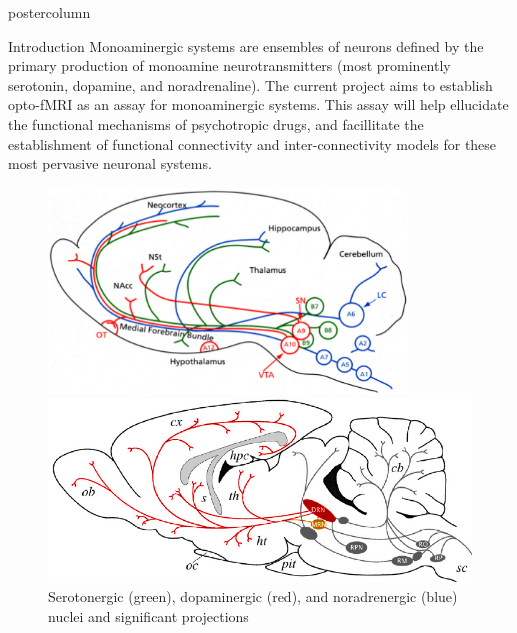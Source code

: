 \documentclass{beamer}
\begin{document}
\begin{frame}
\begin{columns}
\begin{column}{.48\textwidth}
\begin{beamercolorbox}[center]{postercolumn}
{\begin{myblock}{Introduction}
						Monoaminergic systems are ensembles of neurons defined by the 
						primary production of monoamine neurotransmitters (most prominently 
						serotonin, dopamine, and noradrenaline).
						The current project aims to establish opto-fMRI as an assay for
						monoaminergic systems.
						This assay will help ellucidate the functional mechanisms of
						psychotropic drugs, and facillitate the establishment of functional
						connectivity and inter-connectivity models for these most pervasive
						neuronal systems.
						\vspace{0.4em}
						\begin{figure}
							\begin{minipage}{0.43\textwidth}
								\centering\includegraphics[width=0.85\textwidth]{img/mas.png}
								\caption{Serotonergic (green), dopaminergic (red), and
								noradrenergic (blue) nuclei and significant projections \cite{Paivi}}
							\end{minipage}
							\hspace{1em}
							\begin{minipage}{0.45\textwidth}
								\centering\includegraphics[width=1\textwidth]{img/drn_mr_p.png}

\end{minipage}
\end{figure}
\end{myblock}}
\end{beamercolorbox}
\end{column}
\end{columns}
\end{frame}
\end{document}
